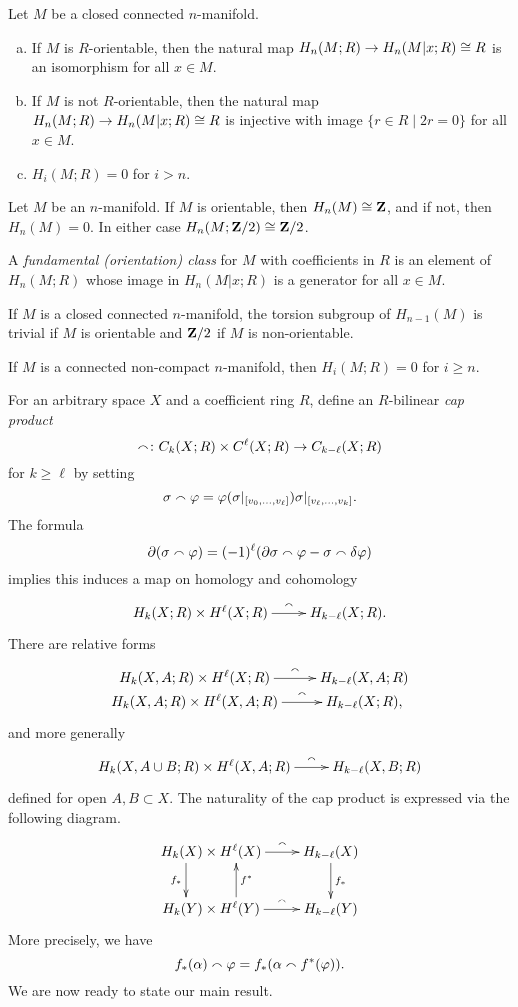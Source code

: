 \begin{theorem}
  Let $M$ be a closed connected $n$-manifold.
  \begin{enumerate}[(a)]
  \item If $M$ is $R$-orientable, then the natural map $H_n(M;R) \rightarrow H_n(M|x;R) \cong R$ is an isomorphism for all $x \in M$.
  \item If $M$ is not $R$-orientable, then the natural map $H_n(M;R) \rightarrow H_n(M|x;R) \cong R$ is injective with image $\{ r \in R \;|\; 2r = 0 \}$ for all $x \in M$.
  \item $H_i(M;R) = 0$ for $i > n$.
  \end{enumerate}
\end{theorem}

\begin{corollary}
  Let $M$ be an $n$-manifold. If $M$ is orientable, then $H_n(M) \cong \mathbf{Z}$, and if not, then $H_n(M) = 0$. In either case $H_n(M;\mathbf{Z}/2) \cong \mathbf{Z}/2$.
\end{corollary}

\begin{definition}
  A \emph{fundamental (orientation) class} for $M$ with coefficients in $R$ is an element of $H_n(M;R)$ whose image in $H_n(M|x;R)$ is a generator for all $x \in M$.
\end{definition}

\begin{corollary}
  If $M$ is a closed connected $n$-manifold, the torsion subgroup of $H_{n-1}(M)$ is trivial if $M$ is orientable and $\mathbf{Z}/2$ if $M$ is non-orientable.
\end{corollary}

\begin{proposition}
  If $M$ is a connected non-compact $n$-manifold, then $H_i(M;R) = 0$ for $i \geq n$.
\end{proposition}

For an arbitrary space $X$ and a coefficient ring $R$, define an $R$-bilinear \emph{cap product}
\[
\smallfrown \colon C_k(X;R) \times C^\ell(X;R) \rightarrow C_{k-\ell}(X;R)
\]
for $k \geq \ell$ by setting
\[
\sigma \smallfrown \varphi = \varphi(\sigma|_{[v_0, \dots, v_\ell]}) \sigma|_{[v_\ell,\dots,v_k]}.
\]
The formula
\[
\partial(\sigma \smallfrown \varphi) = (-1)^\ell(\partial\sigma \smallfrown \varphi - \sigma \smallfrown \delta\varphi)
\]
implies this induces a map on homology and cohomology
\[\xymatrix{
  H_k(X;R) \x H^\ell(X;R) \ar[r]^-\wcap & H_{k-\ell}(X;R).
}\]
There are relative forms
\[\xymatrix@R=0in{
  H_k(X,A;R) \x H^\ell(X  ;R) \ar[r]^-\wcap & H_{k-\ell}(X,A;R) \\
  H_k(X,A;R) \x H^\ell(X,A;R) \ar[r]^-\wcap & H_{k-\ell}(X  ;R),
}\]
and more generally
\[\xymatrix{
  H_k(X, A \cup B; R) \x H^\ell(X,A;R) \ar[r]^-\wcap & H_{k-\ell}(X,B;R)
}\]
defined for open $A, B \subset X$. The naturality of the cap product is expressed via the following diagram.
\[\xymatrix{
  H_k(X) \x H^\ell(X) \ar@<-1.5pc>[d]_-{f_\ast} \ar[r]^-\wcap & H_{k-\ell}(X) \ar[d]^-{f_\ast} \\
  H_k(Y) \x H^\ell(Y) \ar@<-1.5pc>[u]_-{f^\ast} \ar[r]^-\wcap & H_{k-\ell}(Y)
}\]
More precisely, we have
\[
f_\ast(\alpha) \smallfrown \varphi = f_\ast(\alpha \smallfrown f^\ast(\varphi)).
\]
We are now ready to state our main result.

